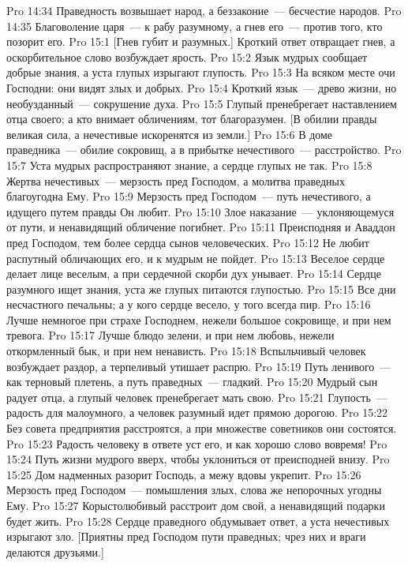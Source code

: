 \vs Pro 14:34 Праведность возвышает народ, а беззаконие~--- бесчестие народов.
\vs Pro 14:35 Благоволение царя~--- к рабу разумному, а гнев его~--- против того, кто позорит его.
\vs Pro 15:1 [Гнев губит и разумных.] Кроткий ответ отвращает гнев, а оскорбительное слово возбуждает ярость.
\vs Pro 15:2 Язык мудрых сообщает добрые знания, а уста глупых изрыгают глупость.
\vs Pro 15:3 На всяком месте очи Господни: они видят злых и добрых.
\vs Pro 15:4 Кроткий язык~--- древо жизни, но необузданный~--- сокрушение духа.
\vs Pro 15:5 Глупый пренебрегает наставлением отца своего; а кто внимает обличениям, тот благоразумен. [В обилии правды великая сила, а нечестивые искоренятся из земли.]
\vs Pro 15:6 В доме праведника~--- обилие сокровищ, а в прибытке нечестивого~--- расстройство.
\vs Pro 15:7 Уста мудрых распространяют знание, а сердце глупых не так.
\vs Pro 15:8 Жертва нечестивых~--- мерзость пред Господом, а молитва праведных благоугодна Ему.
\vs Pro 15:9 Мерзость пред Господом~--- путь нечестивого, а идущего путем правды Он любит.
\vs Pro 15:10 Злое наказание~--- уклоняющемуся от пути, и ненавидящий обличение погибнет.
\vs Pro 15:11 Преисподняя и Аваддон  пред Господом, тем более сердца сынов человеческих.
\vs Pro 15:12 Не любит распутный обличающих его, и к мудрым не пойдет.
\vs Pro 15:13 Веселое сердце делает лице веселым, а при сердечной скорби дух унывает.
\vs Pro 15:14 Сердце разумного ищет знания, уста же глупых питаются глупостью.
\vs Pro 15:15 Все дни несчастного печальны; а у кого сердце весело, у того всегда пир.
\vs Pro 15:16 Лучше немногое при страхе Господнем, нежели большое сокровище, и при нем тревога.
\vs Pro 15:17 Лучше блюдо зелени, и при нем любовь, нежели откормленный бык, и при нем ненависть.
\vs Pro 15:18 Вспыльчивый человек возбуждает раздор, а терпеливый утишает распрю.
\vs Pro 15:19 Путь ленивого~--- как терновый плетень, а путь праведных~--- гладкий.
\vs Pro 15:20 Мудрый сын радует отца, а глупый человек пренебрегает мать свою.
\vs Pro 15:21 Глупость~--- радость для малоумного, а человек разумный идет прямою дорогою.
\vs Pro 15:22 Без совета предприятия расстроятся, а при множестве советников они состоятся.
\vs Pro 15:23 Радость человеку в ответе уст его, и как хорошо слово вовремя!
\vs Pro 15:24 Путь жизни мудрого вверх, чтобы уклониться от преисподней внизу.
\vs Pro 15:25 Дом надменных разорит Господь, а межу вдовы укрепит.
\vs Pro 15:26 Мерзость пред Господом~--- помышления злых, слова же непорочных угодны Ему.
\vs Pro 15:27 Корыстолюбивый расстроит дом свой, а ненавидящий подарки будет жить.
\vs Pro 15:28 Сердце праведного обдумывает ответ, а уста нечестивых изрыгают зло. [Приятны пред Господом пути праведных; чрез них и враги делаются друзьями.]

